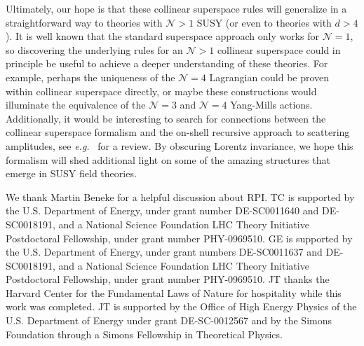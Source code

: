 \documentclass[12pt,document,nofootinbib,superscriptaddress,onecolumn,preprintnumbers,balancelastpage]{article}
\begin{document}
\begin{spacing}{1.2}
Ultimately, our hope is that these collinear superspace rules will generalize in a straightforward way to theories with $\mathcal{N} > 1$ SUSY (or even to theories with $d > 4$).
%
It is well known that the standard superspace approach only works for $\mathcal{N} = 1$, so discovering the underlying rules for an $\mathcal{N} > 1$ collinear superspace could in principle be useful to achieve a deeper understanding of these theories.
%
For example, perhaps the uniqueness of the $\mathcal{N}=4$ Lagrangian could be proven within collinear superspace directly, or maybe these constructions would illuminate the equivalence of the $\mathcal{N} = 3$ and $\mathcal{N} = 4$ Yang-Mills actions.
%
Additionally, it would be interesting to search for connections between the collinear superspace formalism and the on-shell recursive approach to scattering amplitudes, see \emph{e.g.}~\cite{Elvang:2013cua} for a review.
%
By obscuring Lorentz invariance, we hope this formalism will shed additional light on some of the amazing structures that emerge in SUSY field theories.

\acknowledgments

We thank Martin Beneke for a helpful discussion about RPI.
%
TC is supported by the U.S. Department of Energy, under grant number DE-SC0011640 and DE-SC0018191, and a National Science Foundation LHC Theory Initiative Postdoctoral Fellowship, under grant number PHY-0969510.
%
GE is supported by the U.S. Department of Energy, under grant numbers DE-SC0011637 and DE-SC0018191, and a National Science Foundation LHC Theory Initiative Postdoctoral Fellowship, under grant number PHY-0969510.
%
JT thanks the Harvard Center for the Fundamental Laws of Nature for hospitality while this work was completed.
%
JT is supported by the Office of High Energy Physics of the U.S. Department of Energy under grant DE-SC-0012567 and by the Simons Foundation through a Simons Fellowship in Theoretical Physics.


\appendix

\end{spacing}
\end{document}
